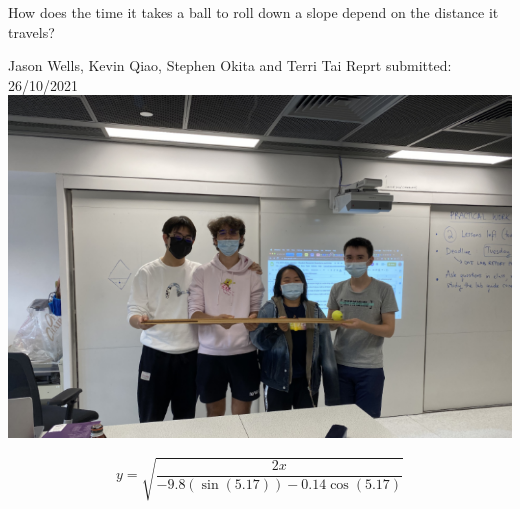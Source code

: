 \documentclass[12pt]{report}
\begin{document}
\begin{center}
    {\Large How does the time it takes a ball to roll down a slope depend on the distance it travels?}
    
    \vspace{1cm}
    {\large Jason Wells, Kevin Qiao, Stephen Okita and Terri Tai}
    {\large Reprt submitted: 26/10/2021}
    \vspace{2cm}
    \includegraphics[width=\textwidth]{Img.png}

\end{center}

\[ y = \sqrt{\frac{2x}{-9.8(\sin(5.17))-0.14\cos(5.17)}}\]
\end{document}
